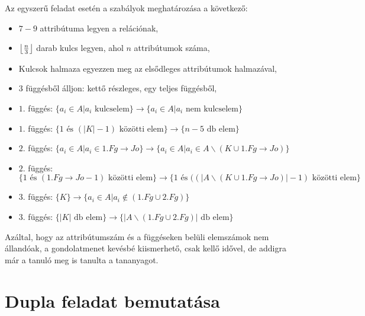 Az egyszerű feladat esetén a szabályok meghatározása a következő:
\begin{itemize}
    \item $7-9$ attribútuma legyen a relációnak,
    \item $\floor*{\frac{n}{3}}$ darab kulcs legyen, ahol $n$ attribútumok száma,
    \item Kulcsok halmaza egyezzen meg az elsődleges attribútumok halmazával,
    \item $3$ függésből álljon: kettő részleges, egy teljes függésből,
    \item $1.$ függés: $\big\{ a_i \in A \big| a_i \text{ kulcselem}  \big\} \longrightarrow \big\{  a_i \in A \big| a_i \text{ nem kulcselem}  \big\}$ 
    \item $1. $ függés: $\big \{ 1 \text{ és } (|K|-1) \text{ közötti elem} \big\} \longrightarrow \big\{ n-5 \text{ db elem} \big \}$
    \item $2.$ függés: $\big\{ a_i \in A \big| a_i \in 1.Fg \rightarrow Jo  \big\} \longrightarrow \big\{  a_i \in A \big| a_i \in A \backslash (K \cup 1.Fg \rightarrow Jo)  \big\}$ 
    \item $2. $ függés: $\big \{ 1 \text{ és } (1.Fg\rightarrow Jo - 1) \text{ közötti elem} \big\} \longrightarrow \big\{ 1 \text { és } ( (|A \backslash (K \cup 1.Fg \rightarrow Jo)| - 1)  \text{ közötti elem} \big \}$
    \item $3.$ függés: $\big\{ K \big\} \longrightarrow \big\{  a_i \in A \big| a_i \not\in (1.Fg \cup 2.Fg)  \big\}$ 
    \item $3. $ függés: $\big \{ |K| \text{ db elem} \big\} \longrightarrow \big\{|A \backslash (1.Fg \cup 2.Fg)| \text{ db elem} \big \}$
\end{itemize}

Azáltal, hogy az attribútumszám és a függéseken belüli elemszámok nem állandóak, a gondolatmenet kevésbé kiismerhető, csak kellő idővel, de addigra már a tanuló meg is tanulta a tananyagot. 

\section{Dupla feladat bemutatása}

